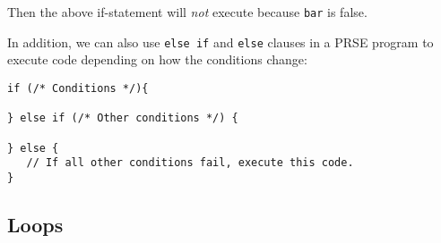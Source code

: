 \documentclass[letterpaper, 12pt]{article}
\begin{document}
Then the above if-statement will {\em not} execute because \texttt{bar} is false.\linebreak

In addition, we can also use \texttt{else if} and \texttt{else} clauses in a PRSE program to execute
code depending on how the conditions change:

\begin{lstlisting}
if (/* Conditions */){

} else if (/* Other conditions */) {

} else {
   // If all other conditions fail, execute this code.
}
\end{lstlisting}

\subsection{Loops}
\label{sec:flowcontrol-loops}
\end{document}
